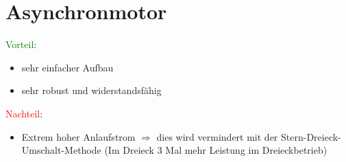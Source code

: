 \section{Asynchronmotor}
\textcolor{green}{Vorteil}:
\begin{itemize}
	\item sehr einfacher Aufbau
	\item sehr robust und widerstandsfähig 
\end{itemize}
\textcolor{red}{Nachteil}:
\begin{itemize}
	\item Extrem hoher Anlaufstrom \newline
		$\Rightarrow$ dies wird vermindert mit der Stern-Dreieck-Umschalt-Methode \newline
        (Im Dreieck 3 Mal mehr Leistung im Dreieckbetrieb)
\end{itemize}

